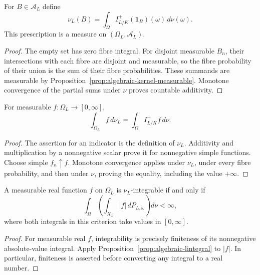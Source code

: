 \begin{definition}\label{def:algebraic-measure}
\leanok
{}
For $B\in\mathcal A_L$ define
\[
 \nu_L(B)=\int_\Omega I^+_{L/K}(\mathbf1_B)(\omega)\,d\nu(\omega).
\]
This prescription is a measure on $(\Omega_L,\mathcal A_L)$.
\end{definition}
\begin{proof}
The empty set has zero fibre integral. For disjoint measurable $B_n$,
their intersections with each fibre are disjoint and measurable, so
the fibre probability of their union is the sum of their fibre
probabilities. These summands are measurable by
Proposition~\ref{prop:algebraic-kernel-measurable}. Monotone convergence
of the partial sums under $\nu$ proves countable additivity.
\end{proof}

\begin{proposition}\label{prop:algebraic-lintegral}
\leanok
{}
For measurable $f:\Omega_L\to[0,\infty]$,
\[
 \int_{\Omega_L} f\,d\nu_L=\int_\Omega I^+_{L/K}f\,d\nu.
\]
\end{proposition}
\begin{proof}
The assertion for an indicator is the definition of $\nu_L$.
Additivity and multiplication by a nonnegative scalar prove it for
nonnegative simple functions. Choose simple $f_n\uparrow f$.
Monotone convergence applies under $\nu_L$, under every fibre
probability, and then under $\nu$, proving the equality, including
the value $+\infty$.
\end{proof}

\begin{proposition}\label{prop:algebraic-integrability}
\leanok
{}
A measurable real function $f$ on $\Omega_L$ is $\nu_L$-integrable
if and only if
\[
 \int_\Omega\left(\int_{X_\omega}|f|\,dP_{L,\omega}\right)d\nu<\infty,
\]
where both integrals in this criterion take values in $[0,\infty]$.
\end{proposition}
\begin{proof}
For measurable real $f$, integrability is precisely finiteness of its
nonnegative absolute-value integral. Apply
Proposition~\ref{prop:algebraic-lintegral} to $|f|$. In particular,
finiteness is asserted before converting any integral to a real number.
\end{proof}


